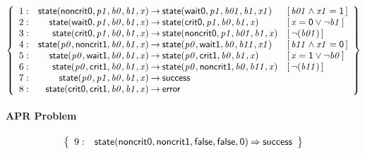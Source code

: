 \documentclass[a4paper]{article}
\newcommand{\symb}[1]{\mathsf{#1}}
\newcommand{\var}[1]{\mathit{#1}}
\newcommand{\Constraint}[1]{[\, #1 \,]}
\begin{document}
\[
\left\{
\begin{array}{rr@{\>}c@{\>}ll}
\mathrm{1} : 
 & \symb{state}(\symb{noncrit0},\var{p1},\var{b0},\var{b1},\var{x})
 & \to 
 & \symb{state}(\symb{wait0},\var{p1},\var{b01},\var{b1},\var{x1})
 & \Constraint{\var{b01} \land \var{x1} = \symb{1}}\\

\mathrm{2} : 
 & \symb{state}(\symb{wait0},\var{p1},\var{b0},\var{b1},\var{x})
 & \to 
 & \symb{state}(\symb{crit0},\var{p1},\var{b0},\var{b1},\var{x})
 & \Constraint{\var{x} = \symb{0} \lor \neg \var{b1}}\\

\mathrm{3} : 
 & \symb{state}(\symb{crit0},\var{p1},\var{b0},\var{b1},\var{x})
 & \to 
 & \symb{state}(\symb{noncrit0},\var{p1},\var{b01},\var{b1},\var{x})
 & \Constraint{\neg(\var{b01})}\\

\mathrm{4} : 
 & \symb{state}(\var{p0},\symb{noncrit1},\var{b0},\var{b1},\var{x})
 & \to 
 & \symb{state}(\var{p0},\symb{wait1},\var{b0},\var{b11},\var{x1})
 & \Constraint{\var{b11} \land \var{x1} = \symb{0}}\\

\mathrm{5} : 
 & \symb{state}(\var{p0},\symb{wait1},\var{b0},\var{b1},\var{x})
 & \to 
 & \symb{state}(\var{p0},\symb{crit1},\var{b0},\var{b1},\var{x})
 & \Constraint{\var{x} = \symb{1} \lor \neg \var{b0}}\\

\mathrm{6} : 
 & \symb{state}(\var{p0},\symb{crit1},\var{b0},\var{b1},\var{x})
 & \to 
 & \symb{state}(\var{p0},\symb{noncrit1},\var{b0},\var{b11},\var{x})
 & \Constraint{\neg(\var{b11})}\\

\mathrm{7} : 
 & \symb{state}(\var{p0},\var{p1},\var{b0},\var{b1},\var{x})
 & \to 
 & \symb{success}\\

\mathrm{8} : 
 & \symb{state}(\symb{crit0},\symb{crit1},\var{b0},\var{b1},\var{x})
 & \to 
 & \symb{error}\\

\end{array}
\right\}
\]


\paragraph{APR Problem}

\[
\left\{
\begin{array}{rr@{\>}c@{\>}ll}
\mathrm{9} : 
 & \symb{state}(\symb{noncrit0},\symb{noncrit1},\symb{false},\symb{false},\symb{0})
 & \Rightarrow 
 & \symb{success}\\

\end{array}
\right\}
\]
\end{document}
